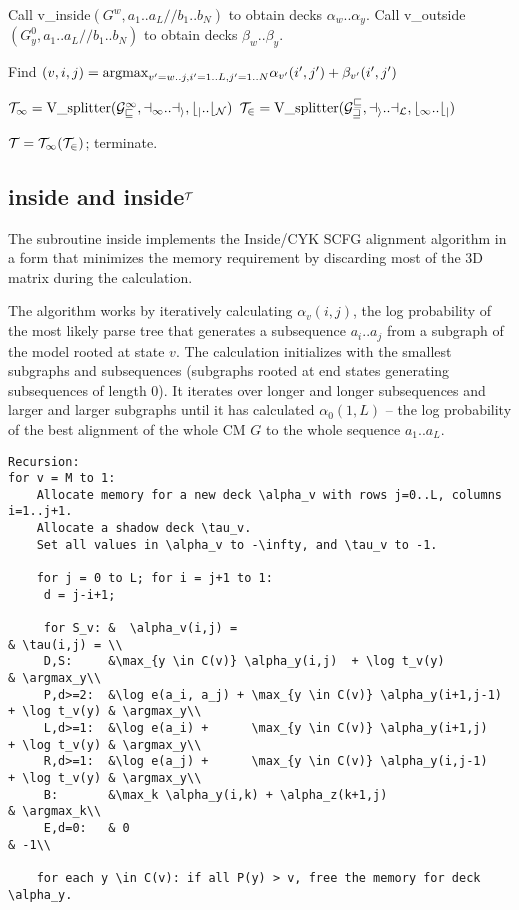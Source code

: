 \documentclass[11pt]{article}
\def\argmax{\mbox{\rm{argmax}}}      %
\begin{document}
Call v\_inside$(G^w, a_1..a_L//b_1..b_N)$ to obtain decks $\alpha_w..\alpha_y$.
Call v\_outside$(G^0_y, a_1..a_L//b_1..b_N)$ to obtain decks $\beta_w..\beta_y$.

Find $(v,i,j) = \argmax_{v'=w..j, i'=1..L, j'=1..N} \alpha_{v'}(i',j') + \beta_{v'}(i',j')$

$\cal{T}_1 = \mbox{V\_splitter}(G^1_v, a_1..a_i, b_j..b_N)$
$\cal{T}_2 = \mbox{V\_splitter}(G^v_w, a_i..a_L, b_1..b_j)$

$\cal{T} = \cal{T}_1 (\cal{T}_2)$; terminate.

\subsection{inside and inside$^{\cal{T}}$}

The subroutine inside implements the Inside/CYK SCFG alignment
algorithm in a form that minimizes the memory requirement by
discarding most of the 3D matrix during the calculation.

The algorithm works by iteratively calculating $\alpha_v(i,j)$, the
log probability of the most likely parse tree that generates a
subsequence $a_i..a_j$ from a subgraph of the model rooted at state
$v$. The calculation initializes with the smallest subgraphs and
subsequences (subgraphs rooted at end states generating subsequences
of length 0). It iterates over longer and longer subsequences and
larger and larger subgraphs until it has calculated $\alpha_0(1,L)$ --
the log probability of the best alignment of the whole CM $G$ to the
whole sequence $a_1..a_L$.

\begin{verbatim}
Recursion:
for v = M to 1:
    Allocate memory for a new deck \alpha_v with rows j=0..L, columns i=1..j+1.
    Allocate a shadow deck \tau_v.
    Set all values in \alpha_v to -\infty, and \tau_v to -1.

    for j = 0 to L; for i = j+1 to 1:
     d = j-i+1;
     
     for S_v: &  \alpha_v(i,j) =                                                    & \tau(i,j) = \\
     D,S:     &\max_{y \in C(v)} \alpha_y(i,j)  + \log t_v(y)	                    & \argmax_y\\
     P,d>=2:  &\log e(a_i, a_j) + \max_{y \in C(v)} \alpha_y(i+1,j-1) + \log t_v(y) & \argmax_y\\
     L,d>=1:  &\log e(a_i) +      \max_{y \in C(v)} \alpha_y(i+1,j)   + \log t_v(y) & \argmax_y\\
     R,d>=1:  &\log e(a_j) +      \max_{y \in C(v)} \alpha_y(i,j-1)   + \log t_v(y) & \argmax_y\\
     B:       &\max_k \alpha_y(i,k) + \alpha_z(k+1,j)                               & \argmax_k\\
     E,d=0:   & 0                                                                   & -1\\

    for each y \in C(v): if all P(y) > v, free the memory for deck \alpha_y.
\end{verbatim}
\end{document}
